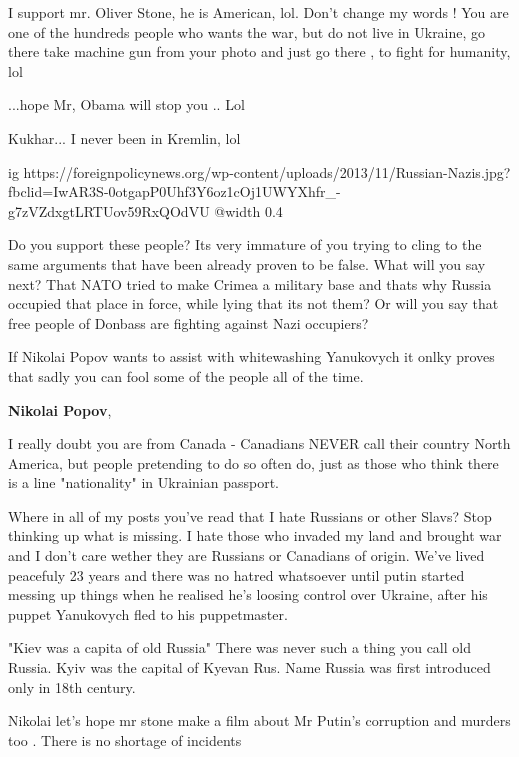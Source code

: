\begin{itemize}
\begin{itemize}

I support mr. Oliver Stone, he is American, lol. Don't change my words ! You
are one of the hundreds people who wants the war, but do not live in Ukraine,
go there take machine gun from your photo and just go there , to fight for
humanity, lol

...hope Mr, Obama will stop you .. Lol

Kukhar... I never been in Kremlin, lol


\ifcmt
  ig https://foreignpolicynews.org/wp-content/uploads/2013/11/Russian-Nazis.jpg?fbclid=IwAR3S-0otgapP0Uhf3Y6oz1cOj1UWYXhfr_-g7zVZdxgtLRTUov59RxQOdVU
  @width 0.4
\fi

Do you support these people? Its very immature of you trying to cling to the
same arguments that have been already proven to be false. What will you say
next? That NATO tried to make Crimea a military base and thats why Russia
occupied that place in force, while lying that its not them? Or will you say
that free people of Donbass are fighting against Nazi occupiers?


If Nikolai Popov wants to assist with whitewashing Yanukovych it onlky proves
that sadly you can fool some of the people all of the time.

\textbf{Nikolai Popov}, 

I really doubt you are from Canada - Canadians NEVER call their country North
America, but people pretending to do so often do, just as those who think there
is a line "nationality" in Ukrainian passport.

Where in all of my posts you've read that I hate Russians or other Slavs? Stop
thinking up what is missing. I hate those who invaded my land and brought war
and I don't care wether they are Russians or Canadians of origin. We've lived
peacefuly 23 years and there was no hatred whatsoever until putin started
messing up things when he realised he's loosing control over Ukraine, after his
puppet Yanukovych fled to his puppetmaster.

"Kiev was a capita of old Russia" There was never such a thing you call old
Russia. Kyiv was the capital of Kyevan Rus. Name Russia was first introduced
only in 18th century.


Nikolai let's hope mr stone make a film about Mr Putin's corruption and murders
too . There is no shortage of incidents


\end{itemize}
\end{itemize}
